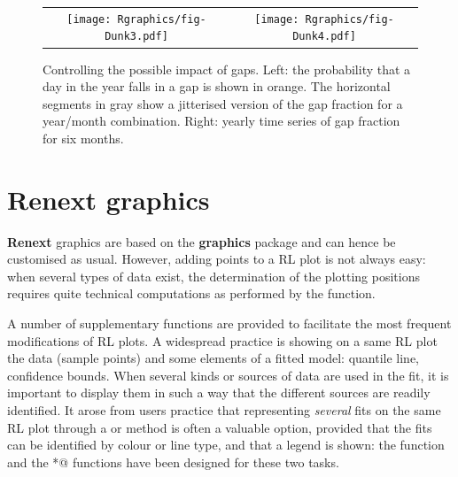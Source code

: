 \documentclass[a4paper]{report}
\newcommand{\pkg}[1]{\textbf{#1}}
\begin{document}
\begin{figure}
\begin{tabular}{c c} 
     \texttt{[image: Rgraphics/fig-Dunk3.pdf]} & 
     \texttt{[image: Rgraphics/fig-Dunk4.pdf]} 
   \end{tabular}
   \caption{
     \label{DUNKDIAG}
     Controlling the possible impact of gaps. Left: the probability
     that a day in the year falls in a gap is shown in orange. The
     horizontal segments in gray show a jitterised version of the gap
     fraction for a year/month combination. Right: yearly time series
     of gap fraction for six months.  }
\end{figure}



\chapter{Renext graphics}

\label{Chap-RenextGraphics}

\pkg{Renext} graphics are based on the \pkg{graphics} package and can
hence be customised as usual. However, adding points to a RL plot is
not always easy: when several types of data exist, the determination
of the plotting positions requires quite technical computations as
performed by the \verb@SandT@ function.

A number of supplementary functions are provided to facilitate the
most frequent modifications of RL plots. A widespread practice is
showing on a same RL plot the data (sample points) and some elements
of a fitted model: quantile line, confidence bounds. When several
kinds or sources of data are used in the fit, it is important to
display them in such a way that the different sources are readily
identified.  It arose from users practice that representing \textit{several}
fits on the same RL plot through a \verb@lines@ or \verb@points@
method is often a valuable option, provided that the fits can be
identified by colour or line type, and that a legend is shown: the
\verb@RLpar@ function and the \verb@RLlegend*@ functions have been
designed for these two tasks.
\end{document}
